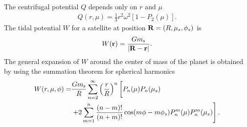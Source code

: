 The centrifugal potential $Q$ depends only on $r$ and $\mu$
%
\begin{equation} \begin{aligned} Q(r,\mu) = \frac{1}{3}r^2\omega^2\left[1-P_2(\mu)
        \right].  \end{aligned} \label{eq:centrifugal} \end{equation}
%
The tidal potential $W$ for a satellite at position ${\bf R}=(R,\mu_s,\phi_s)$ is
%
\begin{equation} \begin{aligned} W({\bf r}) = \frac{Gm_{\rm s}}{\left| {\bf R} - {\bf
        r} \right|}.  \end{aligned} \label{eq:tidal} \end{equation}
%
The general expansion of $W$ around the center of mass of the planet is obtained by
using the summation theorem for spherical harmonics \citep{gavrilov1977}  
%
\begin{equation} \begin{aligned} W(r,\mu,\phi) =& \frac{Gm_{\rm s}}{R}
        \sum_{n=2}^\infty \left( \frac{r}{R} \right)^n \left[ P_n(\mu) P_n(\mu_s) \phantom{\frac{1}{1}}\right. \\
        & \left. + 2 \sum_{m=1}^{n} \frac{(n-m)!}{(n+m)!} \cos(m\phi - m\phi_s)
    P_n^m(\mu) P_n^m(\mu_s) \right].  \end{aligned} \label{eq:tidal_general}
    \end{equation}

